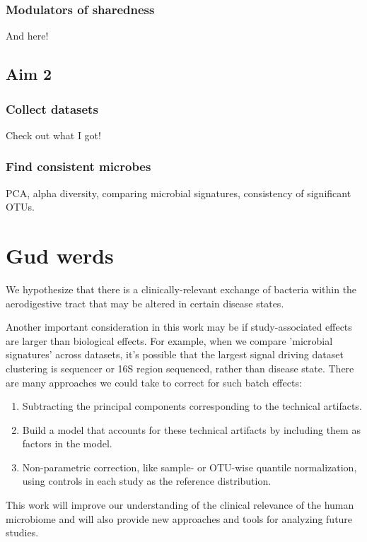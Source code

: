 \documentclass[12pt]{article}
\begin{document}
\subsubsection{Modulators of sharedness}
And here!

\subsection{Aim 2}
\subsubsection{Collect datasets}
Check out what I got!

\subsubsection{Find consistent microbes}
PCA, alpha diversity, comparing microbial signatures, consistency of significant OTUs.

\section{Gud werds}
We hypothesize that there is a clinically-relevant exchange of bacteria within the aerodigestive tract that may be altered in certain disease states. 


Another important consideration in this work may be if study-associated effects are larger than biological effects. For example, when we compare 'microbial signatures' across datasets, it's possible that the largest signal driving dataset clustering is sequencer or 16S region sequenced, rather than disease state. There are many approaches we could take to correct for such batch effects:
\begin{enumerate}
	\item Subtracting the principal components corresponding to the technical artifacts.
	\item Build a model that accounts for these technical artifacts by including them as factors in the model.
	\item Non-parametric correction, like sample- or OTU-wise quantile normalization, using controls in each study as the reference distribution.
\end{enumerate}

This work will improve our 
understanding of the clinical relevance of the human microbiome and 
will also provide new approaches and tools for analyzing future 
studies.
\end{document}
